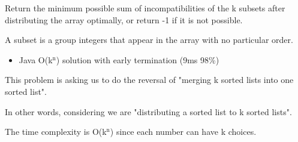 \documentclass[9pt, b5paper]{article}
\begin{document}
Return the minimum possible sum of incompatibilities of the k subsets after distributing the array optimally, or return -1 if it is not possible.

A subset is a group integers that appear in the array with no particular order.
\begin{itemize}
\item Java O(k$^{\text{n}}$) solution with early termination (9ms 98\%)
\end{itemize}

This problem is asking us to do the reversal of "merging k sorted lists into one sorted list".

In other words, considering we are "distributing a sorted list to k sorted lists".

The time complexity is O(k$^{\text{n}}$) since each number can have k choices.
\end{document}
